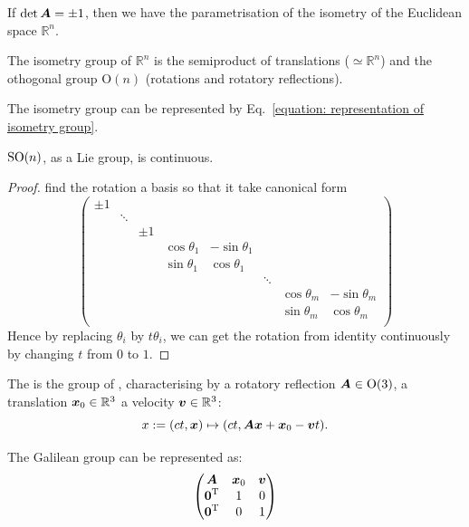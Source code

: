 \documentclass[openany]{book}
\begin{document}
If $\det \boldsymbol{A} = \pm 1$, then we have the parametrisation of the isometry of the Euclidean space $\mathbb R^n$. 

\begin{theorem}
	The isometry group of $\mathbb R^n$ is the semiproduct of translations ($\simeq \mathbb R^n$) and the othogonal group $\mathrm O(n)$ (rotations and rotatory reflections).
\end{theorem}

The isometry group can be represented by Eq.~\ref{equation: representation of isometry group}.

\begin{theorem}
	$\operatorname{SO}(n)$, as a Lie group, is continuous.
\end{theorem}
\begin{proof}
	find the rotation a basis so that it take canonical form
	\begin{equation*}
		\begin{pmatrix}
			\pm 1 &		   &  &&\\
				& \ddots &  \\
				&		   & \pm 1 \\
			& & & \cos\theta_1 & -\sin\theta_1\\
			& & & \sin\theta_1 & \cos\theta_1\\
			& & &		&				& \ddots & \\
			& & &		&				&		 &  \cos\theta_m & -\sin\theta_m \\
			& & &		&				& 		 &	\sin \theta_m & \cos \theta_m \\
		\end{pmatrix}
	\end{equation*}
	Hence by replacing $\theta_i$ by $t \theta_i$, we can get the rotation from identity continuously by changing $t$ from $0$ to $1$.
\end{proof}

The  is the group of , characterising by a rotatory reflection $\boldsymbol{A} \in \mathrm O(3)$, a translation $\boldsymbol{x}_0 \in \mathbb R^3$ a velocity $\boldsymbol{v} \in \mathbb R^3$:
\begin{equation*}
	x := (ct, \boldsymbol{x}) \mapsto (ct, \boldsymbol{A} \boldsymbol{x} + \boldsymbol{x}_0 - \boldsymbol{v} t).
\end{equation*}

The Galilean group can be represented as:
\begin{equation}\label{equation: representation of Galilean group}
	\begin{pmatrix}
		\boldsymbol{A} & \boldsymbol{x}_0 & \boldsymbol{v} \\
		\boldsymbol{0}^\mathrm T & 1 & 0 \\
		\boldsymbol{0}^\mathrm T & 0 & 1
	\end{pmatrix}	
\end{equation}
\end{document}
